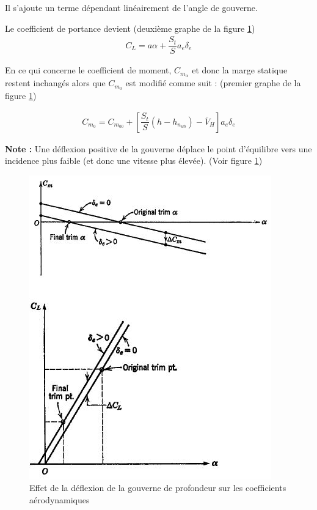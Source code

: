 \documentclass{report}
\begin{document}
Il s'ajoute un terme dépendant linéairement de l'angle de gouverne. 

Le coefficient de portance devient (deuxième graphe de la figure \ref{26})
\begin{eqnarray}
C_L=a\alpha+\dfrac{S_t}{S}a_e\delta_e
\end{eqnarray}

En ce qui concerne le coefficient de moment, $C_{m_\alpha}$ et donc la marge statique restent inchangés alors que $C_{m_0}$ est modifié comme suit : (premier graphe de la figure \ref{26})

\begin{eqnarray}
C_{m_0}=C_{m_{00}}+\left[\dfrac{S_t}{S}(h-h_{n_{wb}})-\bar{V}_H\right]a_e\delta_e
\end{eqnarray}

\textbf{Note :} Une déflexion positive de la gouverne déplace le point d'équilibre vers une incidence plus faible (et donc une vitesse plus élevée). (Voir figure \ref{26})
\begin{figure}[h!]
    \centering
    \includegraphics[scale=0.8]{26.JPG}
    \caption{Effet de la déflexion de la gouverne de profondeur sur les coefficients aérodynamiques}
    \label{26}
\end{figure}
\end{document}
